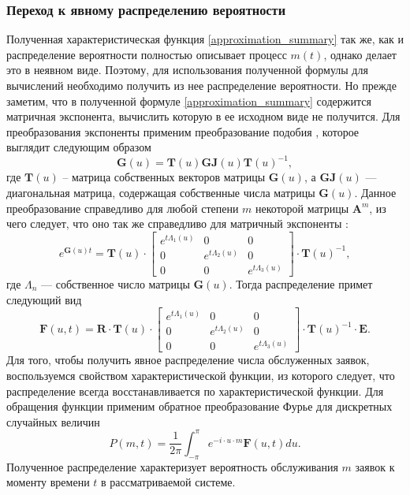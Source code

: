 \subsubsection{Переход к явному распределению вероятности}
Полученная характеристическая функция \eqref{approximation_summary} так же, как и распределение вероятности полностью описывает процесс $m(t)$, однако делает это в неявном виде. Поэтому, для использования полученной формулы для вычислений необходимо получить из нее распределение вероятности.
Но прежде заметим, что в полученной формуле \eqref{approximation_summary} содержится матричная экспонента, вычислить которую в ее исходном виде не получится. Для преобразования экспоненты применим преобразование подобия \cite{bronson1991matrix}, которое выглядит следующим образом
\begin{equation*}
	\boldsymbol{G}(u) =\boldsymbol{T}(u)\boldsymbol{GJ}(u)\boldsymbol{T}(u)^{-1},
\end{equation*}
где $\boldsymbol{T}(u)$ – матрица собственных векторов матрицы $\boldsymbol{G}(u)$, а $\boldsymbol{GJ}(u)$ --- диагональная матрица, содержащая собственные числа матрицы $\boldsymbol{G}(u)$. Данное преобразование справедливо для любой степени $m$ некоторой матрицы $\boldsymbol{A}^{m}$, из чего следует, что оно так же справедливо для матричный экспоненты \cite{egorov2006prog}:
\begin{equation*}
	e^{\boldsymbol{G}(u)t}=\boldsymbol{T}(u)\cdot \begin{bmatrix}
		e^{t \Lambda_{1}(u)} & 0 &  0\\
		0 & e^{t \Lambda_{2}(u)} & 0\\
		0 & 0 &	e^{t \Lambda_{3}(u)}
	\end{bmatrix} \cdot \boldsymbol{T}(u)^{-1},
\end{equation*}
где $\Lambda_{n}$ --- собственное число матрицы $\boldsymbol{G}(u)$. Тогда распределение примет следующий вид
\begin{equation*}
	\boldsymbol{F}(u,t)=\boldsymbol{R} \cdot \boldsymbol{T}(u)\cdot \begin{bmatrix}
		e^{t \Lambda_{1}(u)} & 0 &  0\\
		0 & e^{t \Lambda_{2}(u)} & 0\\
		0 & 0 &	e^{t \Lambda_{3}(u)}
	\end{bmatrix} \cdot \boldsymbol{T}(u)^{-1} \cdot \boldsymbol{E}.
\end{equation*}
Для того, чтобы получить явное распределение числа обслуженных заявок, воспользуемся свойством характеристической функции, из которого следует, что распределение всегда восстанавливается по характеристической функции. Для обращения функции применим обратное преобразование Фурье для дискретных случайных величин
\begin{equation} \label{distr_simple_summary}
	P(m,t) = \dfrac{1}{2\pi}\int_{-\pi}^{\pi} e^{-i \cdot u \cdot m} \boldsymbol{F}(u,t)du.
\end{equation}
Полученное распределение характеризует вероятность обслуживания $m$ заявок к моменту времени $t$ в рассматриваемой системе.
\clearpage
